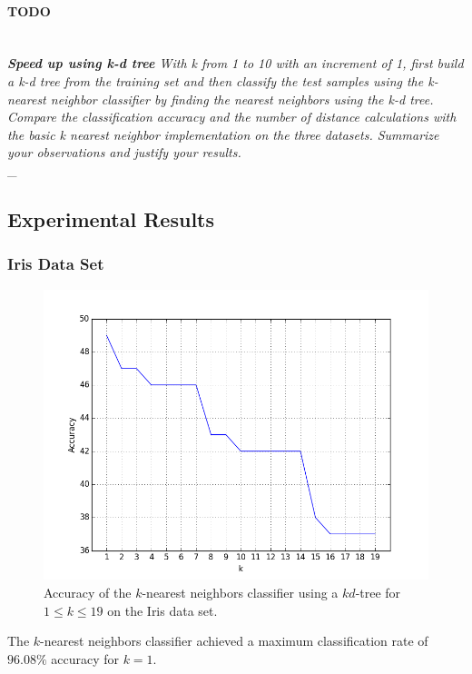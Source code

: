 \documentclass{article}
\numberwithin{figure}{section}
\newcommand{\outline}[2]{\paragraph{\textsc{#1}}\hrulefill~\\{\small\it #2}\\\_\hrulefill}
\newcommand{\todo}[1]{\outline{\large TODO}{#1}}
\begin{document}
\todo{{\bf Speed up using k-d tree} With k from 1 to 10 with an increment of 1, first build a k-d tree from the training set and then classify the test samples using the k-nearest neighbor classifier by finding the nearest neighbors using the k-d tree. Compare the classification accuracy and the number of distance calculations with the basic k nearest neighbor implementation on the three datasets. Summarize your observations and justify your results.}

\subsection{Experimental Results}
\subsubsection{Iris Data Set}
\begin{figure}[H]
\centering
\includegraphics[width=.9\textwidth]{knn_kd_iris}
\caption{Accuracy of the $k$-nearest neighbors classifier using a $kd$-tree for $1 \leq k \leq 19$ on the Iris data set.}
\label{knn_iris}
\end{figure}

The $k$-nearest neighbors classifier achieved a maximum classification rate of $96.08\%$ accuracy for $k=1$.
\end{document}
